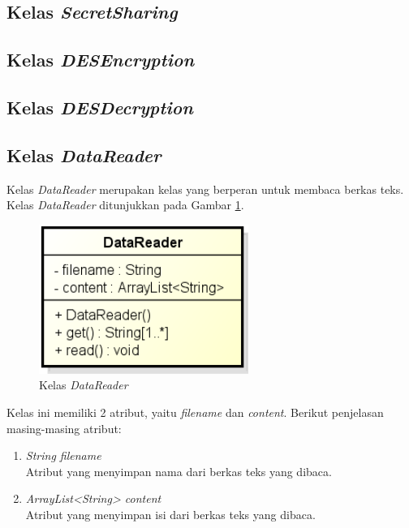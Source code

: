 \subsection{Kelas \textit{SecretSharing}}

\subsection{Kelas \textit{DESEncryption}}

\subsection{Kelas \textit{DESDecryption}}

\subsection{Kelas \textit{DataReader}}

Kelas \textit{DataReader} merupakan kelas yang berperan untuk membaca berkas teks. Kelas \textit{DataReader} ditunjukkan pada Gambar \ref{fig:classdatareader}.

\begin{figure}[H]
	\centering
	\includegraphics[scale=0.8]{Gambar/class_data_reader}
	\caption{Kelas \textit{DataReader}}\label{fig:classdatareader}
\end{figure}

Kelas ini memiliki 2 atribut, yaitu \textit{filename} dan \textit{content}. Berikut penjelasan masing-masing atribut:

\begin{enumerate}
	\item \textit{String filename} \\
	Atribut yang menyimpan nama dari berkas teks yang dibaca.
	\item \textit{ArrayList<String> content} \\
	Atribut yang menyimpan isi dari berkas teks yang dibaca.
\end{enumerate}

